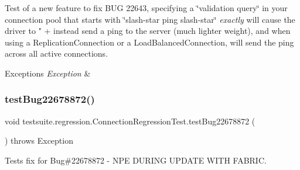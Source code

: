 Test of a new feature to fix B\+UG 22643, specifying a \char`\"{}validation query\char`\"{} in your connection pool that starts with \char`\"{}slash-\/star ping slash-\/star\char`\"{} {\itshape exactly} will cause the driver to " + instead send a ping to the server (much lighter weight), and when using a Replication\+Connection or a Load\+Balanced\+Connection, will send the ping across all active connections.


\begin{DoxyExceptions}{Exceptions}
{\em Exception} & \\
\hline
\end{DoxyExceptions}
\mbox{\label{classtestsuite_1_1regression_1_1_connection_regression_test_a36543b7a9aa8ea81c2e039db4955494c}} 
\subsubsection{\texorpdfstring{test\+Bug22678872()}{testBug22678872()}}
{\footnotesize\ttfamily void testsuite.\+regression.\+Connection\+Regression\+Test.\+test\+Bug22678872 (\begin{DoxyParamCaption}{ }\end{DoxyParamCaption}) throws Exception}

Tests fix for Bug\#22678872 -\/ N\+PE D\+U\+R\+I\+NG U\+P\+D\+A\+TE W\+I\+TH F\+A\+B\+R\+IC.

